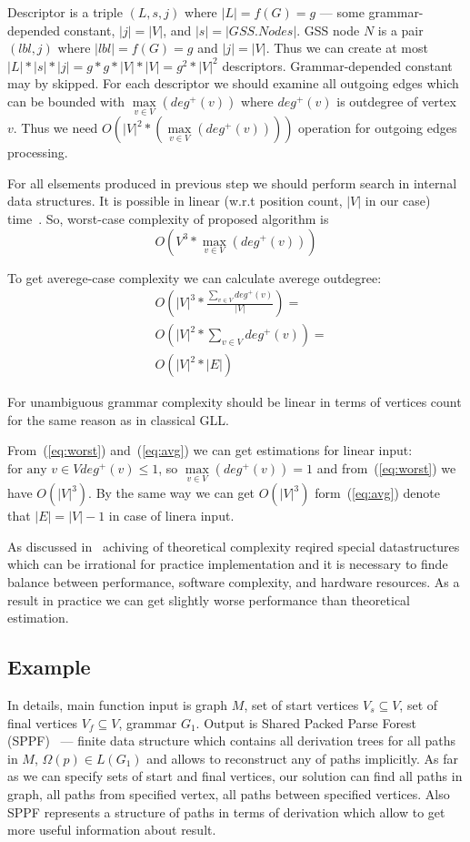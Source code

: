 \documentclass{sig-alternate} %
\begin{document}
Descriptor is a triple $(L, s, j)$ where $|L| = f(G) = g$ --- some grammar-depended constant, $|j| = |V|$, and $|s| = |GSS.Nodes|$.
GSS node $N$ is a pair $(lbl, j)$ where $|lbl| = f(G) = g$ and $|j| = |V|$. 
Thus we can create at most $|L|*|s|*|j| = g * g * |V| * |V| = g^2*|V|^2$ descriptors.
Grammar-depended constant may by skipped.
For each descriptor we should examine all outgoing edges which can be bounded with $\max\limits_{v \in V}(deg^+(v))$  where $deg^+(v)$ is outdegree of vertex $v$.
Thus we need $O(|V|^2*(\max\limits_{v \in V}(deg^+(v))))$ operation for outgoing edges processing.

For all elsements produced in previous step we should perform search in internal data structures. It is possible in linear (w.r.t position count, $|V|$ in our case) time~\cite{modellingGLL}.
So, worst-case complexity of proposed algorithm is 
\begin{equation} \label{eq:worst}
O(V^3*\max\limits_{v \in V}(deg^+(v)))
\end{equation}

To get averege-case complexity we can calculate averege outdegree:
\begin{align} \label{eq:avg}
  & O\left(|V|^3*\frac {\sum\limits_{v \in V} deg^+(v)}{|V|}\right) = \\
  & O\left(|V|^2*\sum\limits_{v \in V} deg^+(v)\right) = \\
  & O\left(|V|^2*|E|\right) 
\end{align}

For unambiguous grammar complexity should be linear in terms of vertices count for the same reason as in classical GLL.

From~(\ref{eq:worst}) and~(\ref{eq:avg}) we can get estimations for linear input: $\text{for any } v \in V deg^+(v) \leq 1$, so $\max\limits_{v \in V}(deg^+(v))  = 1 $ and from~(\ref{eq:worst}) we have $O(|V|^3)$. 
By the same way we can get $O(|V|^3)$ form~(\ref{eq:avg}) denote that $|E| = |V| - 1$ in case of linera input. 

As discussed in~\cite{modellingGLL} achiving of theoretical complexity reqired special datastructures which can be irrational for practice implementation and it is necessary to finde balance between performance, software complexity, and hardware resources.
As a result in practice we can get slightly worse performance than theoretical estimation.

\subsection{Example}
In details, main function input is graph $M$, set of start vertices $V_s\subseteq V$, set of final vertices $V_f\subseteq V$, grammar $G_1$.
Output is Shared Packed Parse Forest (SPPF)~\cite{SPPF} --- finite data structure which contains all derivation trees for all paths in $M$, $\Omega(p) \in L(G_1)$ and allows to reconstruct any of paths implicitly.
As far as we can specify sets of start and final vertices, our solution can find all paths in graph, all paths from specified vertex, all paths between specified vertices. 
Also SPPF represents a structure of paths in terms of derivation which allow to get more useful information about result.
\end{document}
